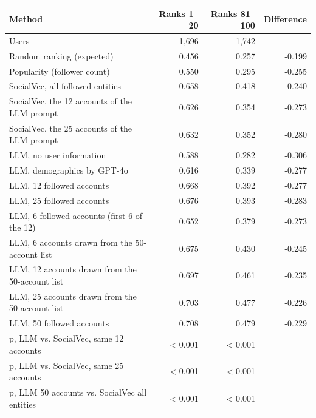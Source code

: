 \begin{tabular}{lrrr}
\toprule
Method & Ranks 1--20 & Ranks 81--100 & Difference \\
\midrule
Users & 1,696 & 1,742 &  \\
Random ranking (expected) & 0.456 & 0.257 & -0.199 \\
Popularity (follower count) & 0.550 & 0.295 & -0.255 \\
SocialVec, all followed entities & 0.658 & 0.418 & -0.240 \\
SocialVec, the 12 accounts of the LLM prompt & 0.626 & 0.354 & -0.273 \\
SocialVec, the 25 accounts of the LLM prompt & 0.632 & 0.352 & -0.280 \\
LLM, no user information & 0.588 & 0.282 & -0.306 \\
LLM, demographics by GPT-4o & 0.616 & 0.339 & -0.277 \\
LLM, 12 followed accounts & 0.668 & 0.392 & -0.277 \\
LLM, 25 followed accounts & 0.676 & 0.393 & -0.283 \\
LLM, 6 followed accounts (first 6 of the 12) & 0.652 & 0.379 & -0.273 \\
LLM, 6 accounts drawn from the 50-account list & 0.675 & 0.430 & -0.245 \\
LLM, 12 accounts drawn from the 50-account list & 0.697 & 0.461 & -0.235 \\
LLM, 25 accounts drawn from the 50-account list & 0.703 & 0.477 & -0.226 \\
LLM, 50 followed accounts & 0.708 & 0.479 & -0.229 \\
p, LLM vs. SocialVec, same 12 accounts & \textless{} 0.001 & \textless{} 0.001 &  \\
p, LLM vs. SocialVec, same 25 accounts & \textless{} 0.001 & \textless{} 0.001 &  \\
p, LLM 50 accounts vs. SocialVec all entities & \textless{} 0.001 & \textless{} 0.001 &  \\
\bottomrule
\end{tabular}
